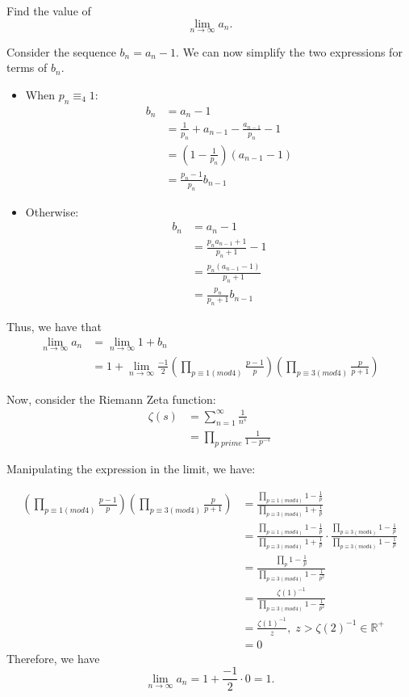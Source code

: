 \documentclass{article}
\begin{document}
\begin{enumerate}
{Find the value of 
$$\lim_{n \to \infty} a_n.$$
}

Consider the sequence $b_n = a_n - 1$. We can now simplify the two expressions for terms of $b_n$.

\begin{itemize}
	\item When $p_n \equiv _4 1$:
	\begin{align*}
		b_n &= a_n - 1 \\ 
		&= \frac{1}{p_n} + a_{n - 1} - \frac{a_{n - 1}}{p_n} - 1 \\
        &= (1 - \frac{1}{p_n})(a_{n - 1} - 1) \\
        &= \frac{p_n - 1}{p_n} b_{n - 1}
	\end{align*}	
	 
	\item Otherwise:
	\begin{align*}
		b_n &= a_n - 1 \\ 
		&= \frac{p_n a_{n - 1} + 1}{p_n + 1} - 1 \\
        &= \frac{p_n(a_{n - 1} - 1)}{p_n + 1} \\
        &= \frac{p_n}{p_n + 1} b_{n - 1}
	\end{align*}	
\end{itemize}

Thus, we have that
\begin{align*}
\lim_{n \rightarrow \infty} a_n &= \lim_{n \rightarrow \infty} 1 + b_n \\
&= 1 + \lim_{n \rightarrow \infty} \frac{-1}{2} (\prod_{p \equiv 1 (mod 4)} \frac{p - 1}{p}) (\prod_{p \equiv 3 (mod 4)} \frac{p}{p + 1})
\end{align*}

Now, consider the Riemann Zeta function:
\begin{align*}
    \zeta (s) &= \sum_{n = 1}^{\infty} \frac{1}{n^s} \\
    &= \prod_{p \; prime} \frac{1}{1 - p^{-s}}
\end{align*}

Manipulating the expression in the limit, we have:

\begin{align*}
    (\prod_{p \equiv 1 (mod 4)} \frac{p - 1}{p}) (\prod_{p \equiv 3 (mod 4)} \frac{p}{p + 1}) &= \frac{\prod_{p \equiv 1 (mod 4)} 1 - \frac{1}{p}}{\prod_{p \equiv 3 (mod 4)} 1 + \frac{1}{p}}\\
    &= \frac{\prod_{p \equiv 1 (mod 4)} 1 - \frac{1}{p}}{\prod_{p \equiv 3 (mod 4)} 1 + \frac{1}{p}} \cdot \frac{\prod_{p \equiv 3 (mod 4)} 1 - \frac{1}{p}}{\prod_{p \equiv 3 (mod 4)} 1 - \frac{1}{p}}\\
    &= \frac{\prod_{p} 1 - \frac{1}{p}}{\prod_{p \equiv 3 (mod 4)} 1 - \frac{1}{p^2}}\\
    &= \frac{\zeta(1)^{-1}}{\prod_{p \equiv 3 (mod 4)} 1 - \frac{1}{p^2}} \\
    &= \frac{\zeta(1)^{-1}}{z}, \; z > \zeta(2)^{-1} \in \mathbb{R}^{+}\\
    &= 0
\end{align*}
    Therefore, we have
$$\lim_{n \rightarrow \infty} a_n = 1 + \frac{-1}{2} \cdot 0 = 1.$$
\end{enumerate}
\end{document}
